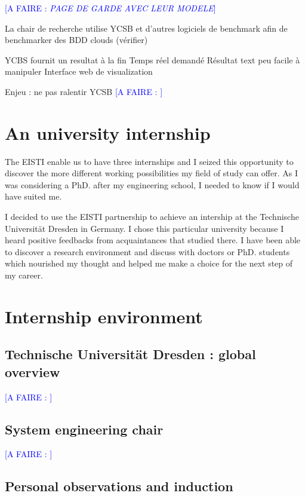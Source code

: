 \documentclass[a4paper,11pt]{article}
\newcommand*{\todo}[1]{\textcolor{blue}{[A FAIRE : \emph{#1}]}}
\begin{document}
\todo{PAGE DE GARDE AVEC LEUR MODELE}

La chair de recherche utilise YCSB et d'autres logiciels de benchmark afin de benchmarker des BDD clouds (vérifier)

YCBS fournit un resultat à la fin
Temps réel demandé
Résultat text peu facile à manipuler
Interface web de visualization

Enjeu : ne pas ralentir YCSB
\todo{}

\newpage

\section{An university internship}\label{partnership}

The EISTI enable us to have three internships and I seized this opportunity to discover the more different working possibilities my field of study can offer. As I was considering a PhD. after my engineering school, I needed to know if I would have suited me.

I decided to use the EISTI partnership to achieve an intership at the Technische Universität Dresden in Germany. I chose this particular university because I heard positive feedbacks from acquaintances that studied there. I have been able to discover a research environment and discuss with doctors or PhD. students which nourished my thought and helped me make a choice for the next step of my career.

\section{Internship environment}

\subsection{Technische Universität Dresden : global overview}

\todo{}

\subsection{System engineering chair}

\todo{}

\subsection{Personal observations and induction}
\end{document}
